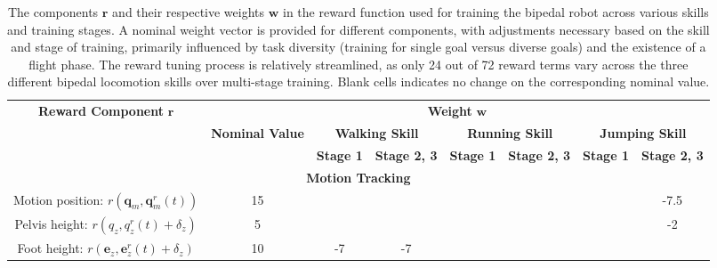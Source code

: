 \begin{table}[!htp]
\centering
\scriptsize
\caption{The components $\mathbf{r}$ and their respective weights $\mathbf{w}$ in the reward function used for training the bipedal robot across various skills and training stages. A nominal weight vector is provided for different components, with adjustments necessary based on the skill and stage of training, primarily influenced by task diversity (training for single goal versus diverse goals) and the existence of a flight phase. The reward tuning process is relatively streamlined, as only 24 out of 72 reward terms vary across the three different bipedal locomotion skills over multi-stage training. Blank cells indicates no change on the corresponding nominal value.}
\label{tab:reward}
\begin{tabular}{|cccccccc|}
\hline
\multicolumn{1}{|c|}{\multirow{3}{*}{\textbf{Reward Component} $\mathbf{r}$}} &
  \multicolumn{7}{c|}{\textbf{Weight} $\mathbf{w}$} \\ \cline{2-8} 
\multicolumn{1}{|c|}{} &
  \multicolumn{1}{c|}{\multirow{2}{*}{\textbf{Nominal Value}}} &
  \multicolumn{2}{c|}{\textbf{Walking Skill}} &
  \multicolumn{2}{c|}{\textbf{Running Skill}} &
  \multicolumn{2}{c|}{\textbf{Jumping Skill}} \\ \cline{3-8} 
\multicolumn{1}{|c|}{} &
  \multicolumn{1}{c|}{} &
  \multicolumn{1}{c|}{\textbf{Stage 1}} &
  \multicolumn{1}{c|}{\textbf{Stage 2, 3}} &
  \multicolumn{1}{c|}{\textbf{Stage 1}} &
  \multicolumn{1}{c|}{\textbf{Stage 2, 3}} &
  \multicolumn{1}{c|}{\textbf{Stage 1}} &
  \textbf{Stage 2, 3} \\ \hline
\multicolumn{8}{|c|}{\textbf{Motion Tracking}} \\ \hline
\multicolumn{1}{|c|}{Motion position: $r(\mathbf{q}_m, \mathbf{q}^r_m(t))$} &
  \multicolumn{1}{c|}{15} &
  \multicolumn{1}{c|}{} &
  \multicolumn{1}{c|}{} &
  \multicolumn{1}{c|}{} &
  \multicolumn{1}{c|}{} &
  \multicolumn{1}{c|}{} &
  -7.5 \\ \hline
\multicolumn{1}{|c|}{Pelvis height: $r(q_z, q^r_z(t)+\delta_z)$} &
  \multicolumn{1}{c|}{5} &
  \multicolumn{1}{c|}{} &
  \multicolumn{1}{c|}{} &
  \multicolumn{1}{c|}{} &
  \multicolumn{1}{c|}{} &
  \multicolumn{1}{c|}{} &
  -2 \\ \hline
\multicolumn{1}{|c|}{Foot height: $r(\mathbf{e}_z, \mathbf{e}^r_z(t)+\delta_z)$} &
  \multicolumn{1}{c|}{10} &
  \multicolumn{1}{c|}{-7} &
  \multicolumn{1}{c|}{-7} &
  \multicolumn{1}{c|}{} &
  \multicolumn{1}{c|}{} &
  \multicolumn{1}{c|}{} &
  {} \\ \hline

\end{tabular}
\end{table}
